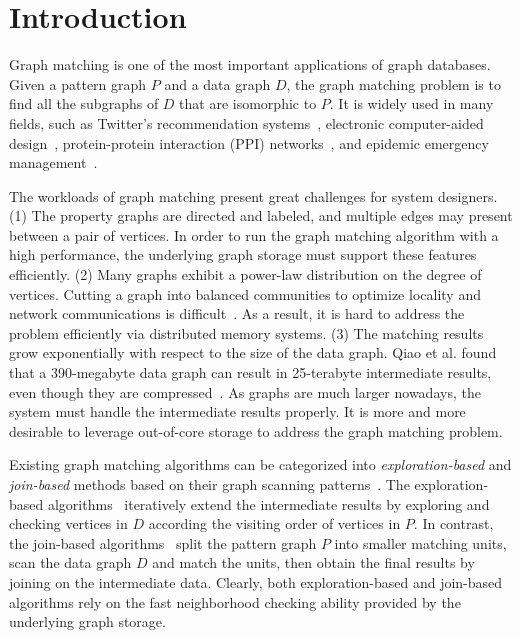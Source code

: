 \section{Introduction}
Graph matching is one of the most important applications of graph databases.
Given a pattern graph $P$ and a data graph $D$, the graph matching problem is to find all the subgraphs of $D$ that are isomorphic to $P$.
It is widely used in many fields,
such as Twitter's recommendation systems~\cite{DBLP:journals/pvldb/GuptaSGGZLL14,DBLP:journals/pvldb/SharmaJBLL16},
electronic computer-aided design~\cite{DBLP:conf/dac/OhlrichEGS93},
protein-protein interaction (PPI) networks~\cite{milenkovic2008uncovering},
and epidemic emergency management~\cite{info:doi/10.2196/26836}.

The workloads of graph matching present great challenges for system designers.
(1) The property graphs are directed and labeled, and multiple edges may present between a pair of vertices.
In order to run the graph matching algorithm with a high performance, the underlying graph storage must support these features efficiently.
(2) Many graphs exhibit a power-law distribution on the degree of vertices.
Cutting a graph into balanced communities to optimize locality and network communications is difficult~\cite{DBLP:journals/im/LeskovecLDM09}.
As a result, it is hard to address the problem efficiently via distributed memory systems.
(3) The matching results grow exponentially with respect to the size of the data graph.
Qiao et al\@. found that a 390-megabyte data graph can result in 25-terabyte intermediate results, even though they are compressed~\cite{DBLP:journals/pvldb/QiaoZC17}.
As graphs are much larger nowadays, the system must handle the intermediate results properly.
It is more and more desirable to leverage out-of-core storage to address the graph matching problem.

Existing graph matching algorithms can be categorized into \emph{exploration-based} and \emph{join-based} methods based on their graph scanning patterns~\cite{DBLP:journals/pvldb/SunSC0H20}.
The exploration-based algorithms~\cite{DBLP:journals/jacm/Ullmann76,DBLP:journals/pami/CordellaFSV04,DBLP:journals/pvldb/ShangZLY08,DBLP:conf/sigmod/HeS08,DBLP:conf/sigmod/HanLL13,DBLP:journals/pvldb/ZhaoH10,DBLP:journals/pvldb/LeeHKL12}
iteratively extend the intermediate results by exploring and checking vertices in $D$ according the visiting order of vertices in $P$.
In contrast, the join-based algorithms~\cite{DBLP:journals/pvldb/LaiQLC15,DBLP:journals/pvldb/QiaoZC17,DBLP:journals/pvldb/SunWWSL12,DBLP:journals/pvldb/MhedhbiS19,DBLP:journals/pvldb/LinMPS16,DBLP:journals/pvldb/AmmarMSJ18} split the pattern graph $P$ into smaller matching units, scan the data graph $D$ and match the units, then obtain the final results by joining on the intermediate data.
Clearly, both exploration-based and join-based algorithms rely on the fast neighborhood checking ability provided by the underlying graph storage.

